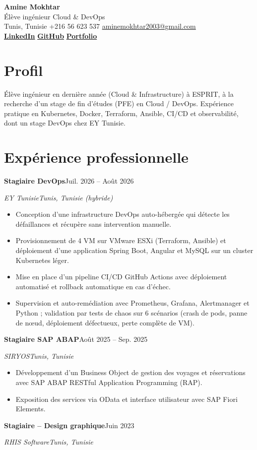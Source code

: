 \documentclass[10pt,a4paper]{article}
\newcommand{\entry}[4]{%
  \textbf{#1}\hfill #2\par
  \textit{#3}\hfill \textit{#4}\par}
\begin{document}
\small

\begin{center}
  {\fontsize{21}{24}\selectfont\bfseries Amine Mokhtar}\\[4pt]
  {\large Élève ingénieur Cloud \& DevOps}\\[4pt]
  Tunis, Tunisie \textbar{} +216 56 623 537 \textbar{} \href{mailto:aminemokhtar2003@gmail.com}{aminemokhtar2003@gmail.com}\\[2pt]
  \href{https://www.linkedin.com/in/amine-mokhtar-679038277/}{\textbf{LinkedIn}} \textbar{}
  \href{https://github.com/the-amine-mokhtar}{\textbf{GitHub}} \textbar{}
  \href{https://the-amine-mokhtar.github.io/the-amine-mokhtar-the-amine-mokhtar.github.io/}{\textbf{Portfolio}}
\end{center}
\vspace{-6pt}

\section{Profil}
Élève ingénieur en dernière année (Cloud \& Infrastructure) à ESPRIT, à la recherche d'un stage de fin d'études (PFE) en Cloud / DevOps. Expérience pratique en Kubernetes, Docker, Terraform, Ansible, CI/CD et observabilité, dont un stage DevOps chez EY Tunisie.

\section{Expérience professionnelle}
\entry{Stagiaire DevOps}{Juil. 2026 -- Août 2026}{EY Tunisie}{Tunis, Tunisie (hybride)}
\begin{itemize}
  \item Conception d'une infrastructure DevOps auto-hébergée qui détecte les défaillances et récupère sans intervention manuelle.
  \item Provisionnement de 4 VM sur VMware ESXi (Terraform, Ansible) et déploiement d'une application Spring Boot, Angular et MySQL sur un cluster Kubernetes léger.
  \item Mise en place d'un pipeline CI/CD GitHub Actions avec déploiement automatisé et rollback automatique en cas d'échec.
  \item Supervision et auto-remédiation avec Prometheus, Grafana, Alertmanager et Python ; validation par tests de chaos sur 6 scénarios (crash de pods, panne de nœud, déploiement défectueux, perte complète de VM).
\end{itemize}
\vspace{2pt}
\entry{Stagiaire SAP ABAP}{Août 2025 -- Sep. 2025}{SIRYOS}{Tunis, Tunisie}
\begin{itemize}
  \item Développement d'un Business Object de gestion des voyages et réservations avec SAP ABAP RESTful Application Programming (RAP).
  \item Exposition des services via OData et interface utilisateur avec SAP Fiori Elements.
\end{itemize}
\vspace{2pt}
\entry{Stagiaire -- Design graphique}{Juin 2023}{RHIS Software}{Tunis, Tunisie}
\end{document}
